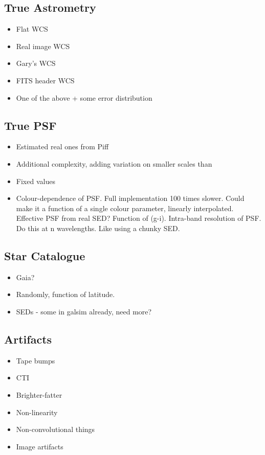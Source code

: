 \documentclass[\docopts]{\docclass}
\begin{document}
\subsection{True Astrometry}

\begin{itemize}
\item Flat WCS
\item Real image WCS
\item Gary's WCS
\item FITS header WCS
\item One of the above + some error distribution
\end{itemize}

\subsection{True PSF}

\begin{itemize}
\item Estimated real ones from Piff
\item Additional complexity, adding variation on smaller scales than 
\item Fixed values
\item Colour-dependence of PSF.
	  Full implementation 100 times slower.
	  Could make it a function of a single colour parameter, linearly interpolated.
	  Effective PSF from real SED? Function of (g-i).
	  Intra-band resolution of PSF.  Do this at n wavelengths.
	  Like using a chunky SED.
\end{itemize}

\subsection{Star Catalogue}

\begin{itemize}
\item Gaia?
\item Randomly, function of latitude.
\item SEDs - some in galsim already, need more?
\end{itemize}

\subsection{Artifacts}
\begin{itemize}
\item Tape bumps
\item CTI
\item Brighter-fatter
\item Non-linearity
\item Non-convolutional things
\item Image artifacts
\end{itemize}
\end{document}
